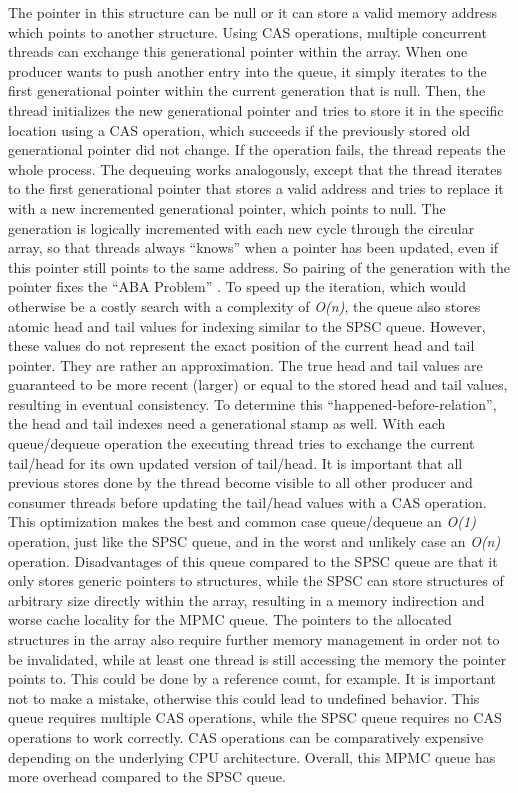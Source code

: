 The pointer in this structure can be null or it can store a valid memory address which points to another structure. Using CAS operations, multiple concurrent threads can exchange this generational pointer within the array. When one producer wants to push another entry into the queue, it simply iterates to the first generational pointer within the current generation that is null. Then, the thread initializes the new generational pointer and tries to store it in the specific location using a CAS operation, which succeeds if the previously stored old generational pointer did not change. If the operation fails, the thread repeats the whole process. The dequeuing works analogously, except that the thread iterates to the first generational pointer that stores a valid address and tries to replace it with a new incremented generational pointer, which points to null. \newline
The generation is logically incremented with each new cycle through the circular array, so that threads always “knows” when a pointer has been updated, even if this pointer still points to the same address. So pairing of the generation with the pointer fixes the “ABA Problem” \cite[223-238]{herlihy:art_of_mp}.\newline
To speed up the iteration, which would otherwise be a costly search with a complexity of \textit{O(n)}, the queue also stores atomic head and tail values for indexing similar to the SPSC queue. However, these values do not represent the exact position of the current head and tail pointer. They are rather an approximation. The true head and tail values are guaranteed to be more recent (larger) or equal to the stored head and tail values, resulting in eventual consistency. To determine this “happened-before-relation”, the head and tail indexes need a generational stamp as well. With each queue/dequeue operation the executing thread tries to exchange the current tail/head for its own updated version of tail/head. It is important that all previous stores done by the thread become visible to all other producer and consumer threads before updating the tail/head values with a CAS operation. This optimization makes the best and common case queue/dequeue an \textit{O(1)} operation, just like the SPSC queue, and in the worst and unlikely case an \textit{O(n)} operation.\newline
Disadvantages of this queue compared to the SPSC queue are that it only stores generic pointers to structures, while the SPSC can store structures of arbitrary size directly within the array, resulting in a memory indirection and worse cache locality for the MPMC queue. The pointers to the allocated structures in the array also require further memory management in order not to be invalidated, while at least one thread is still accessing the memory the pointer points to. This could be done by a reference count, for example. It is important not to make a mistake, otherwise this could lead to undefined behavior. This queue requires multiple CAS operations, while the SPSC queue requires no CAS operations to work correctly. CAS operations can be comparatively expensive depending on the underlying CPU architecture. Overall, this MPMC queue has more overhead compared to the SPSC queue.\newline
